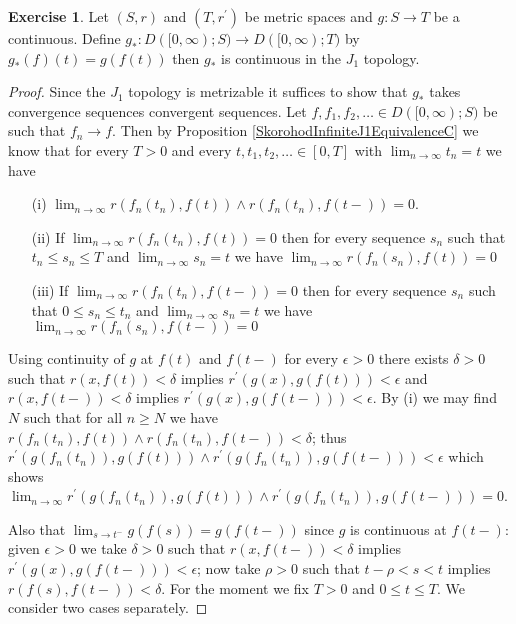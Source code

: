 \documentclass{amsbook}
\theoremstyle{definition}
\newtheorem{xca}{Exercise}
\theoremstyle{remark}
\begin{document}
\begin{xca}\label{SkorohodInfiniteJ1PushForwardContinuous}Let $(S,r)$ and $(T, r^\prime)$ be metric spaces and $g : S  \to T$ be a continuous.  Define $g_* : D([0,\infty); S) \to D([0,\infty); T)$ by $g_*(f)(t) = g(f(t))$ then $g_*$ is
continuous in the $J_1$ topology.
\end{xca}
\begin{proof}
Since the $J_1$ topology is metrizable it suffices to show that $g_*$ takes convergence sequences convergent sequences.  Let $f, f_1, f_2, \dotsc \in  D([0,\infty); S)$ be such that
$f_n \to f$.  Then by Proposition \ref{SkorohodInfiniteJ1EquivalenceC} we know that for every $T >0$ and every $t, t_1, t_2, \dotsc \in [0,T]$ with $\lim_{n \to \infty} t_n = t$ we have 
\begin{itemize}
\item[(i)] $\lim_{n \to \infty} r(f_n(t_n), f(t)) \wedge r(f_n(t_n), f(t-)) = 0$. 
\item[(ii)] If $\lim_{n \to \infty} r(f_n(t_n), f(t)) = 0$ then for every sequence
$s_n$ such that $t_n \leq s_n \leq T$ and $\lim_{n \to \infty} s_n = t$ we have $\lim_{n \to \infty} r(f_n(s_n), f(t)) = 0$
\item[(iii)] If $\lim_{n \to \infty} r(f_n(t_n), f(t-)) = 0$ then for every sequence
$s_n$ such that $0 \leq s_n \leq t_n$ and $\lim_{n \to \infty} s_n = t$ we have $\lim_{n \to \infty} r(f_n(s_n), f(t-)) = 0$
\end{itemize}
Using continuity of $g$ at $f(t)$ and $f(t-)$ for every $\epsilon>0$ there exists $\delta > 0$ such that $r(x, f(t)) < \delta$ implies $r^\prime(g(x), g(f(t))) < \epsilon$ and 
$r(x, f(t-)) < \delta$ implies $r^\prime(g(x), g(f(t-))) < \epsilon$.  By (i) we may find $N$ such that for all $n \geq N$ we have $r(f_n(t_n), f(t)) \wedge r(f_n(t_n), f(t-)) < \delta$; thus
$r^\prime(g(f_n(t_n)), g(f(t))) \wedge r^\prime(g(f_n(t_n)), g(f(t-))) < \epsilon$ which shows $\lim_{n \to \infty} r^\prime(g(f_n(t_n)), g(f(t))) \wedge r^\prime(g(f_n(t_n)), g(f(t-))) = 0$.

Also that $\lim_{s \to t^-} g(f(s)) = g(f(t-))$ since  $g$ is continuous at $f(t-)$: given $\epsilon > 0$ we take $\delta > 0$ such that $r(x, f(t-)) < \delta$ implies $r^\prime(g(x), g(f(t-))) < \epsilon$; now take $\rho > 0$ such that $t - \rho < s < t$ implies $r(f(s), f(t-)) < \delta$.  For the moment we fix $T>0$ and $0 \leq t \leq T$.  We consider two cases separately.


\end{proof}
\end{document}
